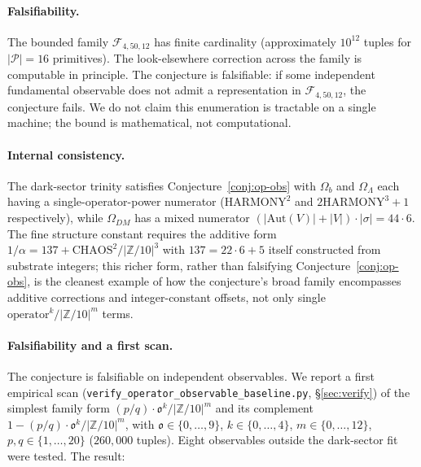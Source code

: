 \documentclass[11pt,reqno]{amsart}
\theoremstyle{plain}
\theoremstyle{definition}
\theoremstyle{remark}
\newcommand{\Z}{\mathbb{Z}}
\newcommand{\Aut}{\mathrm{Aut}}
\begin{document}
\paragraph{Falsifiability.}
The bounded family $\mathcal F_{4, 50, 12}$ has finite cardinality
(approximately $10^{12}$ tuples for $|\mathcal P| = 16$ primitives).
The look-elsewhere correction across the family is computable in
principle. The conjecture is falsifiable: if some independent
fundamental observable does not admit a representation in
$\mathcal F_{4, 50, 12}$, the conjecture fails. We do not claim
this enumeration is tractable on a single machine; the bound is
mathematical, not computational.

\paragraph{Internal consistency.}
The dark-sector trinity satisfies
Conjecture~\ref{conj:op-obs} with $\Omega_b$ and $\Omega_\Lambda$
each having a single-operator-power numerator
($\mathrm{HARMONY}^{2}$ and $2\mathrm{HARMONY}^{3} + 1$
respectively), while $\Omega_{DM}$ has a mixed numerator
$(|\Aut(V)| + |V|) \cdot |\sigma| = 44 \cdot 6$. The fine
structure constant requires the additive form
$1/\alpha = 137 + \mathrm{CHAOS}^{2}/|\Z/10|^{3}$ with
$137 = 22 \cdot 6 + 5$ itself constructed from substrate
integers; this richer form, rather than falsifying
Conjecture~\ref{conj:op-obs}, is the cleanest example of how
the conjecture's broad family encompasses additive corrections
and integer-constant offsets, not only single
$\mathrm{operator}^{k}/|\Z/10|^{m}$ terms.

\paragraph{Falsifiability and a first scan.}
The conjecture is falsifiable on independent observables. We
report a first empirical scan
(\texttt{verify\_operator\_observable\_baseline.py}, \S\ref{sec:verify})
of the simplest family form
$(p/q) \cdot \mathfrak{o}^{k}/|\Z/10|^{m}$ and its complement
$1 - (p/q) \cdot \mathfrak{o}^{k}/|\Z/10|^{m}$, with
$\mathfrak{o} \in \{0, \dots, 9\}$, $k \in \{0, \dots, 4\}$,
$m \in \{0, \dots, 12\}$, $p, q \in \{1, \dots, 20\}$
($260{,}000$ tuples). Eight observables outside the
dark-sector fit were tested. The result:
\end{document}
